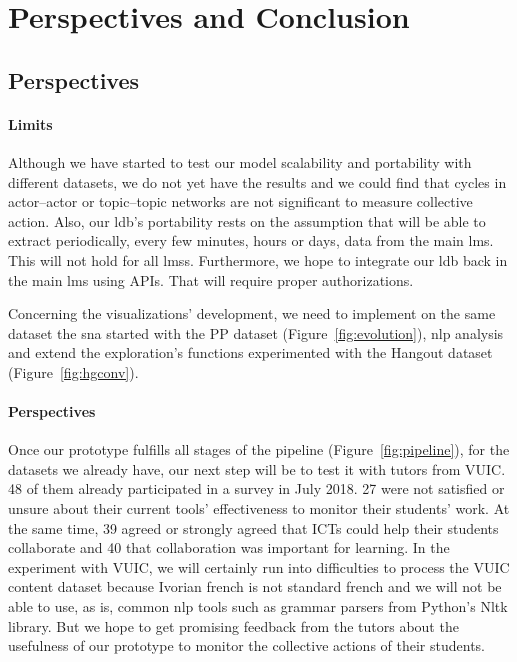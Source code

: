 \documentclass[a4paper,twoside]{article}
\begin{document}
\section{Perspectives and Conclusion}
\label{section:6}

\subsection{Perspectives}
\paragraph{Limits} Although we have started to test our model scalability and portability with different datasets, we do not yet have the results and we could find that cycles in actor--actor or topic--topic networks are not significant to measure collective action.
Also, our \gls{ldb}'s portability rests on the assumption that will be able to extract periodically, every few minutes, hours or days, data from the main \gls{lms}.  This will not hold for all \glspl{lms}.  Furthermore, we hope to integrate our \gls{ldb} back in the main \gls{lms} using APIs.  That will require proper authorizations.

Concerning the visualizations' development, we need to implement on the same dataset the \gls{sna} started with the PP dataset (Figure~\ref{fig:evolution}), \gls{nlp} analysis and extend the exploration's functions experimented with the Hangout dataset (Figure~\ref{fig:hgconv}).

\paragraph{Perspectives} Once our prototype fulfills all stages of the pipeline (Figure~\ref{fig:pipeline}), for the datasets we already have, our next step will be to test it with tutors from VUIC.   48 of them already participated in a survey in July 2018.  27 were not satisfied or unsure about their current tools' effectiveness to monitor their students' work.   At the same time, 39 agreed or strongly agreed that ICTs could help their students collaborate and 40 that collaboration was important for learning.
In the experiment with VUIC, we will certainly run into difficulties to process the VUIC content dataset because Ivorian french is not standard french and we will not be able to use, as is, common \gls{nlp} tools such as grammar parsers from Python's Nltk library.  But we hope to get promising feedback from the tutors about the usefulness of our prototype to monitor the collective actions of their students.
\end{document}
